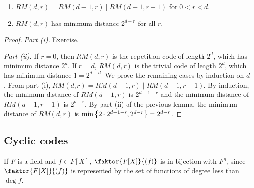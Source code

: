 \begin{theorem}
    \begin{enumerate}
        \item \( RM(d,r) = RM(d-1,r) \mid RM(d-1,r-1) \) for \( 0 < r < d \).
        \item \( RM(d,r) \) has minimum distance \( 2^{d-r} \) for all \( r \).
    \end{enumerate}
\end{theorem}
\begin{proof}
    \emph{Part (i).}
    Exercise.

    \emph{Part (ii).}
    If \( r = 0 \), then \( RM(d,r) \) is the repetition code of length \( 2^d \), which has minimum distance \( 2^d \).
    If \( r = d \), \( RM(d,r) \) is the trivial code of length \( 2^d \), which has minimum distance \( 1 = 2^{d-d} \).
    We prove the remaining cases by induction on \( d \).
    From part (i), \( RM(d,r) = RM(d-1,r) \mid RM(d-1,r-1) \).
    By induction, the minimum distance of \( RM(d-1,r) \) is \( 2^{d-1-r} \) and the minimum distance of \( RM(d-1,r-1) \) is \( 2^{d-r} \).
    By part (ii) of the previous lemma, the minimum distance of \( RM(d,r) \) is \( \min\qty{2\cdot 2^{d-1-r}, 2^{d-r}} = 2^{d-r} \).
\end{proof}

\subsection{Cyclic codes}
If \( F \) is a field and \( f \in F[X] \), \( \faktor{F[X]}{(f)} \) is in bijection with \( F^n \), since \( \faktor{F[X]}{(f)} \) is represented by the set of functions of degree less than \( \deg f \).
